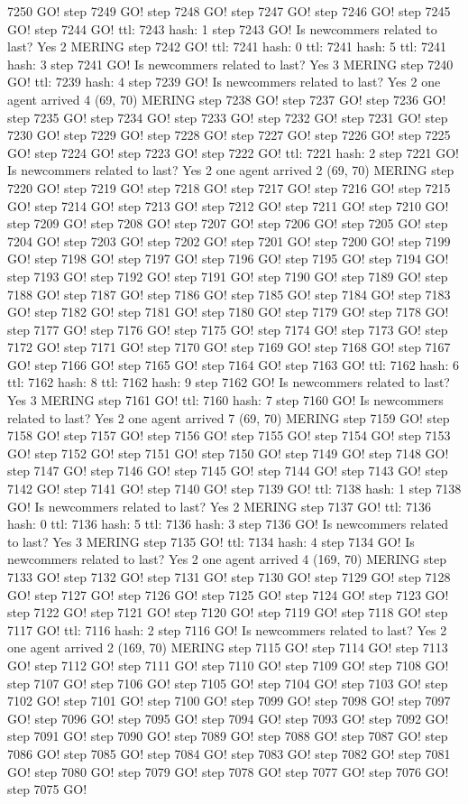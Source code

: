 7250 GO! step 7249 GO! step 7248 GO! step 7247 GO! step 7246 GO! step 7245 GO! step 7244 GO! ttl: 7243 hash: 1 step 7243 GO! Is newcommers related to last? Yes 2 MERING step 7242 GO! ttl: 7241 hash: 0 ttl: 7241 hash: 5 ttl: 7241 hash: 3 step 7241 GO! Is newcommers related to last? Yes 3 MERING step 7240 GO! ttl: 7239 hash: 4 step 7239 GO! Is newcommers related to last? Yes 2 one agent arrived 4 (69, 70) MERING step 7238 GO! step 7237 GO! step 7236 GO! step 7235 GO! step 7234 GO! step 7233 GO! step 7232 GO! step 7231 GO! step 7230 GO! step 7229 GO! step 7228 GO! step 7227 GO! step 7226 GO! step 7225 GO! step 7224 GO! step 7223 GO! step 7222 GO! ttl: 7221 hash: 2 step 7221 GO! Is newcommers related to last? Yes 2 one agent arrived 2 (69, 70) MERING step 7220 GO! step 7219 GO! step 7218 GO! step 7217 GO! step 7216 GO! step 7215 GO! step 7214 GO! step 7213 GO! step 7212 GO! step 7211 GO! step 7210 GO! step 7209 GO! step 7208 GO! step 7207 GO! step 7206 GO! step 7205 GO! step 7204 GO! step 7203 GO! step 7202 GO! step 7201 GO! step 7200 GO! step 7199 GO! step 7198 GO! step 7197 GO! step 7196 GO! step 7195 GO! step 7194 GO! step 7193 GO! step 7192 GO! step 7191 GO! step 7190 GO! step 7189 GO! step 7188 GO! step 7187 GO! step 7186 GO! step 7185 GO! step 7184 GO! step 7183 GO! step 7182 GO! step 7181 GO! step 7180 GO! step 7179 GO! step 7178 GO! step 7177 GO! step 7176 GO! step 7175 GO! step 7174 GO! step 7173 GO! step 7172 GO! step 7171 GO! step 7170 GO! step 7169 GO! step 7168 GO! step 7167 GO! step 7166 GO! step 7165 GO! step 7164 GO! step 7163 GO! ttl: 7162 hash: 6 ttl: 7162 hash: 8 ttl: 7162 hash: 9 step 7162 GO! Is newcommers related to last? Yes 3 MERING step 7161 GO! ttl: 7160 hash: 7 step 7160 GO! Is newcommers related to last? Yes 2 one agent arrived 7 (69, 70) MERING step 7159 GO! step 7158 GO! step 7157 GO! step 7156 GO! step 7155 GO! step 7154 GO! step 7153 GO! step 7152 GO! step 7151 GO! step 7150 GO! step 7149 GO! step 7148 GO! step 7147 GO! step 7146 GO! step 7145 GO! step 7144 GO! step 7143 GO! step 7142 GO! step 7141 GO! step 7140 GO! step 7139 GO! ttl: 7138 hash: 1 step 7138 GO! Is newcommers related to last? Yes 2 MERING step 7137 GO! ttl: 7136 hash: 0 ttl: 7136 hash: 5 ttl: 7136 hash: 3 step 7136 GO! Is newcommers related to last? Yes 3 MERING step 7135 GO! ttl: 7134 hash: 4 step 7134 GO! Is newcommers related to last? Yes 2 one agent arrived 4 (169, 70) MERING step 7133 GO! step 7132 GO! step 7131 GO! step 7130 GO! step 7129 GO! step 7128 GO! step 7127 GO! step 7126 GO! step 7125 GO! step 7124 GO! step 7123 GO! step 7122 GO! step 7121 GO! step 7120 GO! step 7119 GO! step 7118 GO! step 7117 GO! ttl: 7116 hash: 2 step 7116 GO! Is newcommers related to last? Yes 2 one agent arrived 2 (169, 70) MERING step 7115 GO! step 7114 GO! step 7113 GO! step 7112 GO! step 7111 GO! step 7110 GO! step 7109 GO! step 7108 GO! step 7107 GO! step 7106 GO! step 7105 GO! step 7104 GO! step 7103 GO! step 7102 GO! step 7101 GO! step 7100 GO! step 7099 GO! step 7098 GO! step 7097 GO! step 7096 GO! step 7095 GO! step 7094 GO! step 7093 GO! step 7092 GO! step 7091 GO! step 7090 GO! step 7089 GO! step 7088 GO! step 7087 GO! step 7086 GO! step 7085 GO! step 7084 GO! step 7083 GO! step 7082 GO! step 7081 GO! step 7080 GO! step 7079 GO! step 7078 GO! step 7077 GO! step 7076 GO! step 7075 GO! 